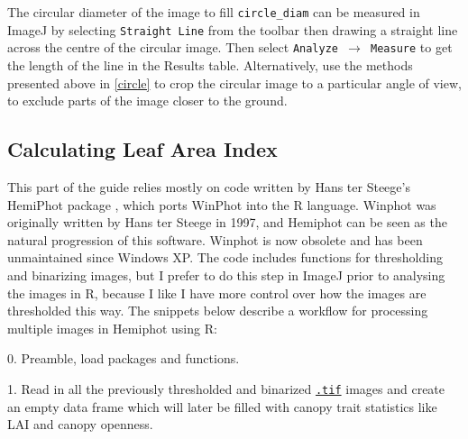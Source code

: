 \documentclass{article}
\newcommand\menu[1]{\texttt{\color{blue}#1}}
\newcommand\file[1]{\texttt{\underline{#1}}}
\begin{document}
\begin{minipage}{\linewidth}

\end{minipage}

The circular diameter of the image to fill \verb|circle_diam| can be measured in ImageJ by selecting \menu{Straight Line} from the toolbar then drawing a straight line across the centre of the circular image. Then select \menu{Analyze $\rightarrow$ Measure} to get the length of the line in the Results table. Alternatively, use the methods presented above in \autoref{circle} to crop the circular image to a particular angle of view, to exclude parts of the image closer to the ground.

\subsection{Calculating Leaf Area Index}

This part of the guide relies mostly on code written by Hans ter Steege's HemiPhot package \citep{Steege2018}, which ports WinPhot into the R language. Winphot was originally written by Hans ter Steege in 1997, and Hemiphot can be seen as the natural progression of this software. Winphot is now obsolete and has been unmaintained since Windows XP. The code includes functions for thresholding and binarizing images, but I prefer to do this step in ImageJ prior to analysing the images in R, because I like I have more control over how the images are thresholded this way. The snippets below describe a workflow for processing multiple images in Hemiphot using R:

\vspace{0.5cm}
\begin{minipage}{\linewidth}
0. Preamble, load packages and functions.

\end{minipage}

\begin{minipage}{\linewidth}
1. Read in all the previously thresholded and binarized \file{.tif} images and create an empty data frame which will later be filled with canopy trait statistics like LAI and canopy openness.

\end{minipage}
\end{document}
